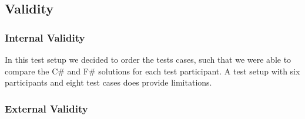 \subsection{Validity} \label{sec:validity}


\subsubsection{Internal Validity}

In this test setup we decided to order the tests cases, such that we were able to compare the C\# and F\# solutions for each test participant. A test setup with six participants and eight test cases does provide limitations. 

\subsubsection{External Validity}

